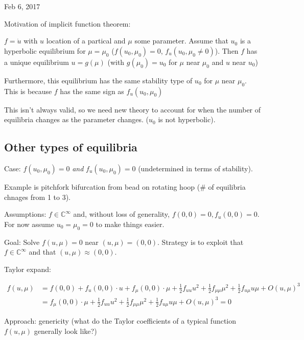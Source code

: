 \documentclass[main.tex]{subfiles}
\begin{document}
\hrulefill{}

Feb 6, 2017

\vspace{3mm}

Motivation of implicit function theorem:

$f = \dot{u}$ with $u$ location of a partical and $\mu$ some parameter. Assume that $u_0$ is a hyperbolic equilibrium for $\mu = \mu_0$ ($f(u_0, \mu_0) = 0$, $f_u(u_0, \mu_0 \neq 0)$). Then $f$ has a unique equilibrium $u = g(\mu)$ (with $g(\mu_0) = u_0$ for $\mu$ near $\mu_0$ and $u$ near $u_0$)

Furthermore, this equilibrium has the same stability type of $u_0$ for $\mu$ near $\mu_0$. This is because $f$ has the same sign as $f_u(u_0, \mu_0)$

This isn't always valid, so we need new theory to account for when the number of equilibria changes as the parameter changes. ($u_0$ is not hyperbolic).

\subsection{Other types of equilibria}

Case: $f(u_0, \mu_0) = 0$ \textit{and} $f_u(u_0, \mu_0) = 0$ (undetermined in terms of stability).

Example is pitchfork bifurcation from bead on rotating hoop (\# of equilibria chnages from 1 to 3).

Assumptions: $f\in \mathbb{C}^\infty$ and, without loss of generality, $f(0, 0) = 0, f_u(0, 0) = 0$. For now assume $u_0 = \mu_0 = 0$ to make things easier.

Goal: Solve $f(u, \mu) = 0$ near $(u, \mu) = (0, 0)$. Strategy is to exploit that $f \in \mathbb{C}^\infty$ and that $(u, \mu) \approx (0, 0)$.

Taylor expand:

\begin{align}
f(u, \mu) &= f(0, 0) + f_u(0, 0)\cdot u + f_{\mu}(0, 0)\cdot \mu + \frac{1}{2}f_{uu} u^2 + \frac{1}{2}f_{\mu\mu} \mu^2 + \frac{1}{2}f_{u\mu} u\mu + O(u, \mu )^3 \\
          &= f_{\mu}(0, 0)\cdot \mu + \frac{1}{2}f_{uu} u^2 + \frac{1}{2}f_{\mu\mu} \mu^2 + \frac{1}{2}f_{u\mu} u\mu + O(u, \mu )^3  = 0
\end{align}

Approach: genericity (what do the Taylor coefficients of a typical function $f(u, \mu)$ generally look like?)
\end{document}

